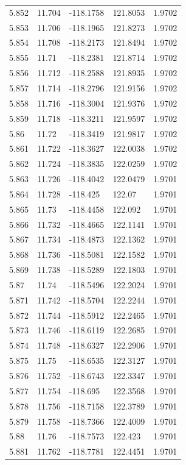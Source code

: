 \begin{tabular}{lllll}
5.852 & 11.704 & -118.1758 & 121.8053 & 1.9702 \\
5.853 & 11.706 & -118.1965 & 121.8273 & 1.9702 \\
5.854 & 11.708 & -118.2173 & 121.8494 & 1.9702 \\
5.855 & 11.71 & -118.2381 & 121.8714 & 1.9702 \\
5.856 & 11.712 & -118.2588 & 121.8935 & 1.9702 \\
5.857 & 11.714 & -118.2796 & 121.9156 & 1.9702 \\
5.858 & 11.716 & -118.3004 & 121.9376 & 1.9702 \\
5.859 & 11.718 & -118.3211 & 121.9597 & 1.9702 \\
5.86 & 11.72 & -118.3419 & 121.9817 & 1.9702 \\
5.861 & 11.722 & -118.3627 & 122.0038 & 1.9702 \\
5.862 & 11.724 & -118.3835 & 122.0259 & 1.9702 \\
5.863 & 11.726 & -118.4042 & 122.0479 & 1.9701 \\
5.864 & 11.728 & -118.425 & 122.07 & 1.9701 \\
5.865 & 11.73 & -118.4458 & 122.092 & 1.9701 \\
5.866 & 11.732 & -118.4665 & 122.1141 & 1.9701 \\
5.867 & 11.734 & -118.4873 & 122.1362 & 1.9701 \\
5.868 & 11.736 & -118.5081 & 122.1582 & 1.9701 \\
5.869 & 11.738 & -118.5289 & 122.1803 & 1.9701 \\
5.87 & 11.74 & -118.5496 & 122.2024 & 1.9701 \\
5.871 & 11.742 & -118.5704 & 122.2244 & 1.9701 \\
5.872 & 11.744 & -118.5912 & 122.2465 & 1.9701 \\
5.873 & 11.746 & -118.6119 & 122.2685 & 1.9701 \\
5.874 & 11.748 & -118.6327 & 122.2906 & 1.9701 \\
5.875 & 11.75 & -118.6535 & 122.3127 & 1.9701 \\
5.876 & 11.752 & -118.6743 & 122.3347 & 1.9701 \\
5.877 & 11.754 & -118.695 & 122.3568 & 1.9701 \\
5.878 & 11.756 & -118.7158 & 122.3789 & 1.9701 \\
5.879 & 11.758 & -118.7366 & 122.4009 & 1.9701 \\
5.88 & 11.76 & -118.7573 & 122.423 & 1.9701 \\
5.881 & 11.762 & -118.7781 & 122.4451 & 1.9701 \\

\end{tabular}
